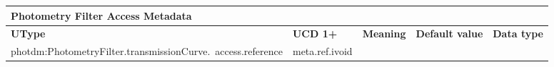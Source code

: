 \documentclass[11pt,a4paper]{ivoa}
\begin{document}
\begin{appendices}



\newpage



\begin{table}[H]
\centering
\begin{adjustbox}{angle=90}
\begin{tabular}{p{2.5in}|p{1.5in}|p{2in}|p{0.74in}|p{0.35in}}
\multicolumn{5}{p{\dimexpr6.59in+8\tabcolsep\relax}}{\centering
{\fontsize{10pt}{12.0pt}\selectfont \textbf{Photometry Filter Access Metadata}}} \\
\hline
\multicolumn{1}{p{2.5in}}{{\fontsize{8pt}{8pt}\selectfont \textbf{UType}}} &
\multicolumn{1}{p{1.5in}}{{\fontsize{8pt}{8pt}\selectfont \textbf{UCD 1+}}} &
\multicolumn{1}{p{2in}}{{\fontsize{8pt}{8pt}\selectfont \textbf{Meaning}}} &
\multicolumn{1}{p{0.74in}}{{\fontsize{8pt}{8pt}\selectfont \textbf{Default value}}} &
\multicolumn{1}{p{0.35in}}{{\fontsize{8pt}{8pt}\selectfont \textbf{Data type}}} \\
\hline
\multicolumn{1}{p{2.5in}}{{\fontsize{8pt}{8pt}
\selectfont photdm:PhotometryFilter.transmissionCurve.\ access.reference}} &
\multicolumn{1}{p{1.5in}}{{\fontsize{8pt}{8pt}\selectfont meta.ref.ivoid }} &


\end{tabular}
\end{adjustbox}
\end{table}
\end{appendices}
\end{document}

